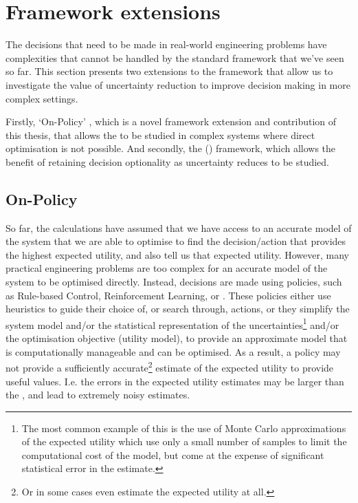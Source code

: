 \vspace*{0.5cm}

\section{Framework extensions} \label{sec:methodology-framework-extensions}

The decisions that need to be made in real-world engineering problems have complexities that cannot be handled by the standard  framework that we've seen so far. This section presents two extensions to the framework that allow us to investigate the value of uncertainty reduction to improve decision making in more complex settings.

Firstly, `On-Policy' , which is a novel framework extension and contribution of this thesis, that allows the  to be studied in complex systems where direct optimisation is not possible. And secondly, the  () framework, which allows the benefit of retaining decision optionality as uncertainty reduces to be studied.

\subsection{On-Policy } \label{sec:methodology-on-policy-voi}

So far, the  calculations have assumed that we have access to an accurate model of the system that we are able to optimise to find the decision/action that provides the highest expected utility, and also tell us that expected utility. However, many practical engineering problems are too complex for an accurate model of the system to be optimised directly. Instead, decisions are made using policies, such as Rule-based Control, Reinforcement Learning, or . These policies either use heuristics to guide their choice of, or search through, actions, or they simplify the system model and/or the statistical representation of the uncertainties\footnote{The most common example of this is the use of Monte Carlo approximations of the expected utility which use only a small number of samples to limit the computational cost of the model, but come at the expense of significant statistical error in the estimate.} and/or the optimisation objective (utility model), to provide an approximate model that is computationally manageable and can be optimised. As a result, a policy may not provide a sufficiently accurate\footnote{Or in some cases even estimate the expected utility at all.} estimate of the expected utility to provide useful  values. I.e. the errors in the expected utility estimates may be larger than the , and lead to extremely noisy  estimates.\\

